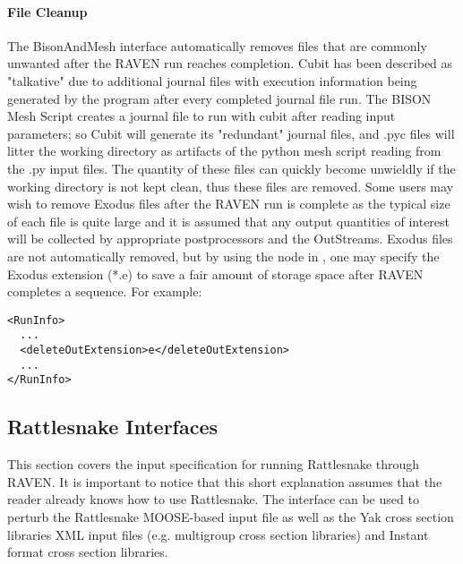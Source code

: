 \paragraph{File Cleanup}
The BisonAndMesh interface automatically removes files that are commonly
unwanted after the RAVEN run reaches completion. Cubit has been described as
"talkative" due to additional journal files with execution information
being generated by the program after every completed journal file run.
The BISON Mesh Script creates a journal file to run with cubit after reading input parameters;
so Cubit will generate its "redundant" journal files, and .pyc files will
litter the working directory as artifacts of the python mesh script
reading from the .py input files.  The quantity of these files can quickly
become unwieldly if the working directory is not kept clean, thus these
files are removed.  Some users
may wish to remove Exodus files after the RAVEN run is complete as
the typical size of each file is quite large and it is assumed that any
output quantities of interest will be collected by appropriate postprocessors
and the OutStreams.  Exodus files are not automatically removed,
but by using the  node in , one
may specify the Exodus extension (*.e) to save a fair amount of storage space
after RAVEN completes a sequence. For example:

\begin{lstlisting}[style=XML]
<RunInfo>
  ...
  <deleteOutExtension>e</deleteOutExtension>
  ...
</RunInfo>
\end{lstlisting}



\subsection{Rattlesnake Interfaces} \label{RattlesnakeInterfaces}
%
This section covers the input specification for running Rattlesnake through RAVEN. It is important
to notice that this short explanation assumes that the reader already knows how to use Rattlesnake.
The interface can be used to perturb the Rattlesnake MOOSE-based input file as well as the Yak
cross section libraries XML input files (e.g. multigroup cross section libraries) and Instant format
cross section libraries.
%
